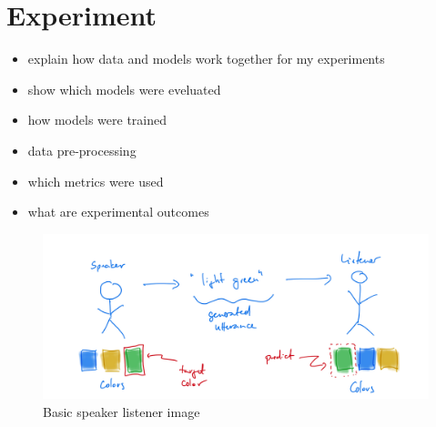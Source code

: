 \section{Experiment}

\begin{itemize}
  \item explain how data and models work together for my experiments
  \item show which models were eveluated
  \item how models were trained
  \item data pre-processing
  \item which metrics were used
  \item what are experimental outcomes
\end{itemize}

\begin{figure}[ht]
\centering
\includegraphics[scale=0.2]{5-experiment/speaker_listener.pdf}
\caption[Speaker - Listener relation]
{Basic speaker listener image}
\label{overview}
\end{figure}